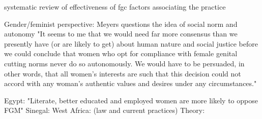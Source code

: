 \documentclass[12pt,]{article}
\begin{document}







systematic review of effectiveness of fgc factors associating the practice \cite{WaigDoos18}

Gender/feminist perspective:  \cite{Meye00} Meyers questions the idea of social norm and autonomy "It seems to me that we would need far more consensus than we presently have (or are likely to get) about human nature and social justice before we could conclude that women who opt for compliance with female genital cutting norms never do so autonomously.  We would have to be persuaded, in other words, that all women's interests are such that this decision could not accord with any woman's authentic values and desires under any circumstances." 

Egypt:  "Literate, better educated and employed women are more likely to oppose FGM" \cite{VanMeek15}
Sinegal: \cite{KandComb15}
West Africa:  \cite{SipsChen12} (law and current practices)
Theory:  

\end{document}
